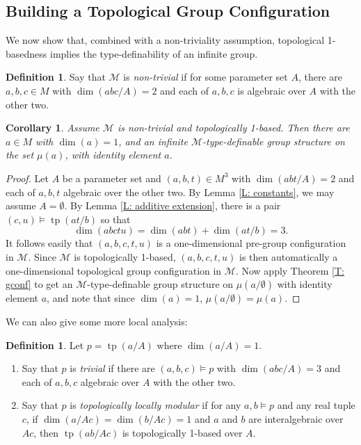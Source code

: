 \documentclass{amsart}
\newtheorem{corollary}[theorem]{Corollary}
\theoremstyle{definition}
\newtheorem{definition}[theorem]{Definition}
\newcommand{\tp}{\operatorname{tp}}
\begin{document}
\subsection{Building a Topological Group Configuration}

We now show that, combined with a non-triviality assumption, topological 1-basedness implies the type-definability of an infinite group.

\begin{definition}\label{D: nontrivial}
Say that $\mathcal M$ is \textit{non-trivial} if for some parameter set $A$, there are $a,b,c\in M$ with $\dim(abc/A)=2$ and each of $a,b,c$ is algebraic over $A$ with the other two.
\end{definition}

    \begin{corollary}\label{C: 1-based gp}
        Assume $\mathcal M$ is non-trivial and topologically 1-based. Then there are $a\in M$ with $\dim(a)=1$, and an infinite $\mathcal M$-type-definable group structure on the set $\mu(a)$, with identity element $a$.  
    \end{corollary}
    \begin{proof}
        Let $A$ be a parameter set and $(a,b,t)\in M^3$ with $\dim(abt/A)=2$ and each of $a,b,t$ algebraic over the other two. By Lemma \ref{L: constants}, we may assume $A=\emptyset$. By Lemma \ref{L: additive extension}, there is a pair $(c,u)\models\tp(at/b)$ so that $$\dim(abctu)=\dim(abt)+\dim(at/b)=3.$$ It follows easily that $(a,b,c,t,u)$ is a one-dimensional pre-group configuration in $\mathcal M$. Since $\mathcal M$ is topologically 1-based, $(a,b,c,t,u)$ is then automatically a one-dimensional topological group configuration in $\mathcal M$. Now apply Theorem \ref{T: gconf} to get an $\mathcal M$-type-definable group structure on $\mu(a/\emptyset)$ with identity element $a$, and note that since $\dim(a)=1$, $\mu(a/\emptyset)=\mu(a)$.
    \end{proof}

    We can also give some more local analysis:

\begin{definition}
    Let $p=\tp(a/A)$ where $\dim(a/A)=1$.
    \begin{enumerate}
        \item Say that $p$ is \textit{trivial} if there are $(a,b,c)\models p$ with $\dim(abc/A)=3$ and each of $a,b,c$ algebraic over $A$ with the other two.
        \item Say that $p$ is \textit{topologically locally modular} if for any $a,b\models p$ and any real tuple $c$, if $\dim(a/Ac)=\dim(b/Ac)=1$ and $a$ and $b$ are interalgebraic over $Ac$, then $\tp(ab/Ac)$ is topologically 1-based over $A$.
    \end{enumerate}
\end{definition}
\end{document}
